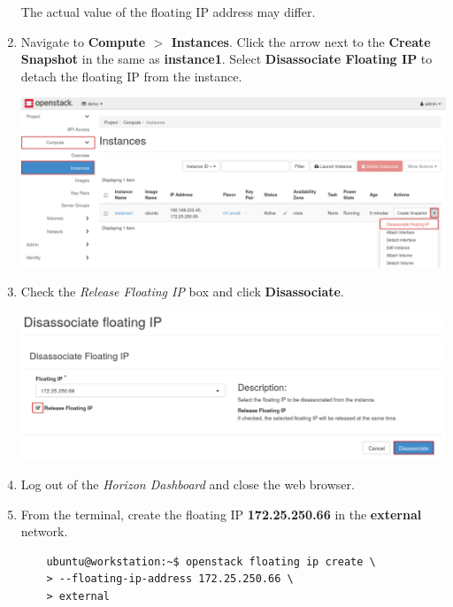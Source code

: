 \documentclass[letterpaper, 12pt]{article}
\begin{document}
\begin{enumerate}
    \begin{notebox}
        The actual value of the floating IP address may differ.
    \end{notebox}

    \item Navigate to \textbf{Compute $>$ Instances}. Click the arrow next to the \textbf{Create Snapshot} in the same
    as \textbf{instance1}. Select \textbf{Disassociate Floating IP} to detach the floating IP from the instance.

    \begin{center}
        \includegraphics[width=\linewidth]{images/part3/step8.png}
    \end{center}

    \item Check the \textit{Release Floating IP} box and click \textbf{Disassociate}.
    
    \begin{center}
        \includegraphics[width=\linewidth]{images/part3/step9.png}
    \end{center}

    \item Log out of the \textit{Horizon Dashboard} and close the web browser.

    \item From the terminal, create the floating IP \textbf{172.25.250.66} in the \textbf{external} network.
    \begin{lstlisting}
    ubuntu@workstation:~$ openstack floating ip create \
    > --floating-ip-address 172.25.250.66 \
    > external
    \end{lstlisting}


\end{enumerate}
\end{document}
